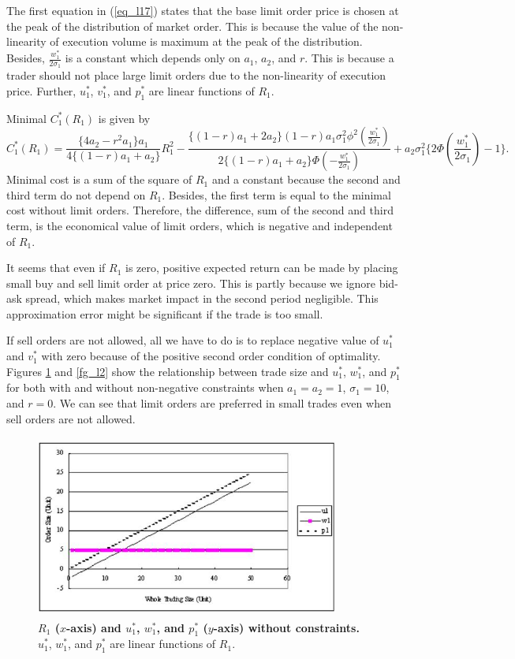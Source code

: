 The first equation in (\ref{eq_l17}) states that the base limit order price is chosen at the peak of the distribution of market order.  This is because the value of the non-linearity of execution volume is maximum at the peak of the distribution.  Besides, $\displaystyle \frac{w_1^*}{2\sigma_1}$ is a constant which depends only on $a_1$, $a_2$, and $r$.  This is because a trader should not place large limit orders due to the non-linearity of execution price.  Further, $u_1^*$, $v_1^*$, and $p_1^*$ are linear functions of $R_1$.

Minimal $C_1^*(R_1)$ is given by
\[ %
  C_1^*(R_1) = \frac{\{4a_2-r^2a_1\}a_1}{4\{(1-r)a_1+a_2\}}R_1^2 - \frac{\{(1-r)a_1+2a_2\}(1-r)a_1\sigma_1^2\phi^2(\frac{w_1^*}{2\sigma_1})}{2\{(1-r)a_1+a_2\}\Phi(-\frac{w_1^*}{2\sigma_1})} + a_2\sigma_1^2\{2\Phi(\frac{w_1^*}{2\sigma_1})-1\}.
\] %
Minimal cost is a sum of the square of $R_1$ and a constant because the second and third term do not depend on $R_1$.  Besides, the first term is equal to the minimal cost without limit orders.  Therefore, the difference, sum of the second and third term, is the economical value of limit orders, which is negative and independent of $R_1$.  

It seems that even if $R_1$ is zero, positive expected return can be made by placing small buy and sell limit order at price zero.  This is partly because we ignore bid-ask spread, which makes market impact in the second period negligible.  This approximation error might be significant if the trade is too small.

If sell orders are not allowed, all we have to do is to replace negative value of $u_1^*$ and $v_1^*$ with zero because of the positive second order condition of optimality.  Figures \ref{fg_l1} and \ref{fg_l2} show the relationship between trade size and $u_1^*$, $w_1^*$, and $p_1^*$ for both with and without non-negative constraints when $a_1=a_2=1$, $\sigma_1=10$, and $r=0$.  We can see that limit orders are preferred in small trades even when sell orders are not allowed.

\begin{figure}[htbp]
\begin{center}
 \includegraphics[width=10cm,height=6cm]{fg_l1n.png}
\end{center}
\caption[$R_1$ and $u_1^*$, $w_1^*$, and $p_1^*$ without constraints]
{{\bf $R_1$ ($x$-axis) and $u_1^*$, $w_1^*$, and $p_1^*$ ($y$-axis) without constraints.}
 \quad $u_1^*$, $w_1^*$, and $p_1^*$ are linear functions of $R_1$.}\label{fg_l1}
\end{figure}

